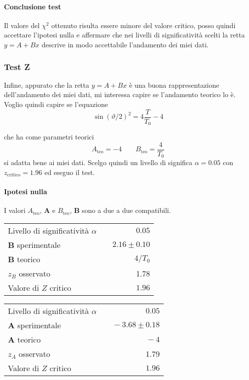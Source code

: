\documentclass{article}
\begin{document}
\paragraph{Conclusione test} Il valore del $\chi^2$ ottenuto risulta essere minore del valore critico, posso quindi accettare l'ipotesi nulla e affermare che nei livelli di significatività scelti la retta $y = A + Bx$ descrive in modo accettabile l'andamento dei miei dati.

\subsubsection{Test Z}
Infine, appurato che la retta $y = A + Bx$ è una buona rappresentazione dell'andamento dei miei dati, mi interessa capire se l'andamento teorico lo è. Voglio quindi capire se l'equazione 
\[
\sin{\left(\vartheta/2\right)}^2 = 4\frac{T}{T_0} - 4
\]

che ha come parametri teorici
\[
A_\text{teo} = -4 \qquad B_\text{teo} =  \frac{4}{T_0}
\]
si adatta bene ai miei dati. Scelgo quindi un livello di significa $\alpha = 0.05$ con $z_{\text{critico}} = 1.96$ ed eseguo il test.

\paragraph{Ipotesi nulla} I valori $A_{\text{teo}}$, $\mathbf{A}$ e  $B_{\text{teo}}$, $\mathbf{B}$ sono a due a due compatibili.

\vspace{0.7cm}
\begin{minipage}{0.5\textwidth}
\begin{table}[H]
	\centering
	\begin{tabular}{lr} 
		Livello di significatività $\alpha$		&$\quad 0.05$  \\
		\textbf{B} sperimentale				& $\quad2.16 \pm  0.10$\\
		\textbf{B} teorico					& $\quad4/T_0$ \\
		$z_{B}$ osservato 					& $\quad$1.78 \\
		Valore di $Z$ critico     	& $\quad 1.96$
	\end{tabular}
\end{table}
\end{minipage}
\begin{minipage}{0.5\textwidth}
\begin{table}[H]
	\centering
	\begin{tabular}{lr} 
		Livello di significatività $\alpha$		&$\quad 0.05$  \\
		\textbf{A} sperimentale             	& $\quad-3.68 \pm 0.18 $     \\
		\textbf{A} teorico					&  $\quad-4$\\
		$z_{A}$ osservato					& 1.79 \\ 
		Valore di $Z$ critico     	& $\quad 1.96$
	\end{tabular}
\end{table}
\end{minipage}
\vspace{0.7cm}
\end{document}
